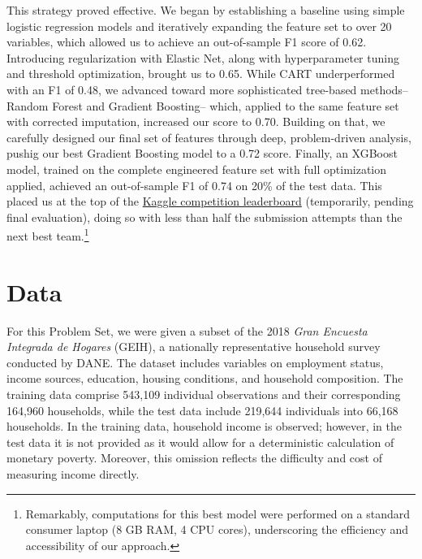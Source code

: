 \documentclass[12pt,a4paper,onecolumn]{article}
\begin{document}
This strategy proved effective. We began by establishing a baseline using simple logistic regression models and iteratively expanding the feature set to over 20 variables, which allowed us to achieve an out-of-sample F1 score of 0.62. Introducing regularization with Elastic Net, along with hyperparameter tuning and threshold optimization, brought us to 0.65. While CART underperformed with an F1 of 0.48, we advanced toward more sophisticated tree-based methods--Random Forest and Gradient Boosting-- which, applied to the same feature set with corrected imputation, increased our score to 0.70. Building on that, we carefully designed our final set of features through deep, problem-driven analysis, pushig our best Gradient Boosting model to a 0.72 score. Finally, an XGBoost model, trained on the complete engineered feature set with full optimization applied, achieved an out-of-sample F1 of 0.74 on 20\% of the test data. This placed us at the top of the \href{https://www.kaggle.com/competitions/uniandes-bdml-2025-20-ps-2/leaderboard}{Kaggle
 competition leaderboard} (temporarily, pending final evaluation), doing so with less than half the submission attempts than the next best team.\footnote{Remarkably, computations for this best model were performed on a standard consumer laptop (8 GB RAM, 4 CPU cores), underscoring the efficiency and accessibility of our approach.}



\section{Data}

For this Problem Set, we were given a subset of the 2018 \textit{Gran Encuesta Integrada de Hogares} (GEIH), a nationally representative household survey conducted by DANE. The dataset includes variables on employment status, income sources, education, housing conditions, and household composition. The training data comprise 543,109 individual observations and their corresponding 164,960 households, while the test data include 219,644 individuals into 66,168 households.  In the training data, household income is observed; however, in the test data it is not provided as it would allow for a deterministic calculation of monetary poverty. Moreover, this omission reflects the difficulty and cost of measuring income directly.
\end{document}
